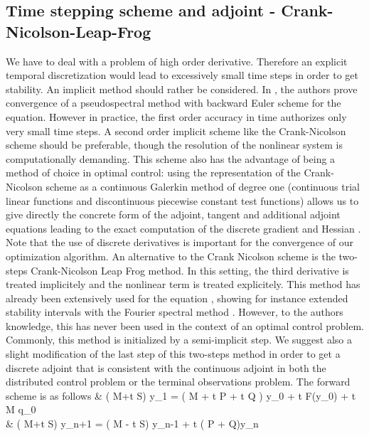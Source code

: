 \subsection{Time stepping scheme and adjoint - Crank-Nicolson-Leap-Frog}
We have to deal with a problem of high order derivative. Therefore an explicit temporal discretization would lead to excessively small time steps in order to get stability. An implicit method should rather be considered. In \cite{li2000error}, the authors prove convergence of a pseudospectral method with backward Euler scheme for the \KdV equation. However in practice, the first order accuracy in time authorizes only very small time steps. A second order implicit scheme like the Crank-Nicolson scheme should be preferable, though the resolution of the nonlinear system is computationally demanding. This scheme also has the advantage of being a method of choice in optimal control: using the representation of the Crank-Nicolson scheme as a continuous Galerkin method of degree one (continuous trial linear functions and discontinuous piecewise constant test functions) allows us to give directly the concrete form of the adjoint, tangent and additional adjoint equations leading to the exact computation of the discrete gradient and Hessian \cite{meidner2007adaptive}. Note that the use of discrete derivatives is important for the convergence of our optimization algorithm. An alternative to the Crank Nicolson scheme is the two-steps Crank-Nicolson Leap Frog method. In this setting, the third derivative is treated implicitely and the nonlinear term is treated explicitely. This method has already been extensively used for the \KdV equation \cite{shen2003new,ma2000legendre,ma2001optimal}, showing for instance extended stability intervals with the Fourier spectral method \cite{chan1985fourier}. However, to the authors knowledge, this has never been used in the context of an optimal control problem. Commonly, this method is initialized by a semi-implicit step. We suggest also a slight modification of the last step of this two-steps method in order to get a discrete adjoint that is consistent with the continuous adjoint in both the distributed control problem or the terminal observations problem. The forward scheme is as follows
\bealn
& \left( M+\Delta t S\right) y_1 = \left( M + \Delta t P + \gamma \Delta t Q \right) y_0 + \Delta t F(y_0) + \Delta t M q_0 \\
& \left( M+\Delta t S\right) y_{n+1} = \left( M - \Delta t S\right) y_{n-1} +  \Delta t \left( P + \gamma Q\right)y_n \\
